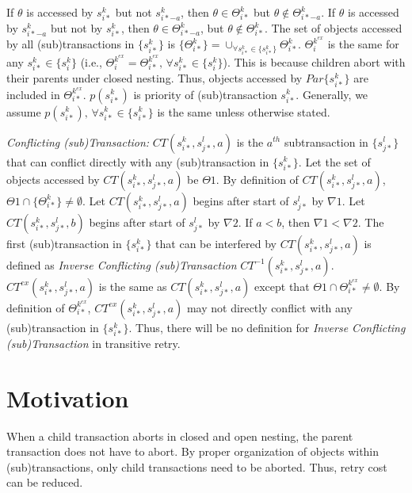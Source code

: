 \documentclass[letter]{sig-alternate}
\begin{document}
If $\theta$ is accessed by $s_{i*}^{k}$ but not $s_{i*-a}^{k}$,
then $\theta\in\Theta_{i*}^{k}$ but $\theta\not\in\Theta_{i*-a}^{k}$.
If $\theta$ is accessed by $s_{i*-a}^{k}$ but not by $s_{i*}^{k}$,
then $\theta\in\Theta_{i*-a}^{k}$, but $\theta\not\in\Theta_{i*}^{k}$.
The set of objects accessed by all (sub)transactions in $\{s_{i*}^{k}\}$
is $\{\Theta_{i*}^{k}\}=\cup_{\forall s_{i*}^{k}\in\{s_{i*}^{k}\}}\Theta_{i*}^{k}$. $\Theta_{i}^{k^{ex}}$
is the same for any $s_{i*}^{k}\in\{s_{i}^{k}\}$ (i.e., $\Theta_{i}^{k^{ex}}=\Theta_{i*}^{k^{ex}},\,\forall s_{i*}^{k}\in\{s_{i}^{k}\}$).
This is because children abort with their parents under closed nesting.
Thus, objects accessed by $Par\{s_{i*}^{k}\}$ are included in $\Theta_{i*}^{k^{ex}}$. $p(s_{i*}^{k})$ is priority of (sub)transaction $s_{i*}^{k}$. Generally,
we assume $p(s_{i*}^{k}),\,\forall s_{i*}^{k}\in\{s_{i*}^{k}\}$ is
the same unless otherwise stated.

\textit{Conflicting (sub)Transaction:} $CT(s_{i*}^{k},s_{j*}^{l},a)$
is the $a^{th}$ subtransaction in $\{s_{j*}^{l}\}$ that can conflict
directly with any (sub)transaction in $\{s_{i*}^{k}\}$. Let the set
of objects accessed by $CT(s_{i*}^{k},s_{j*}^{l},a)$ be $\Theta1$.
By definition of $CT(s_{i*}^{k},s_{j*}^{l},a)$, $\Theta1\cap\{\Theta_{i*}^{k}\}\neq\emptyset$.
Let $CT(s_{i*}^{k},s_{j*}^{l},a)$ begins after start of $s_{j*}^{l}$
by $\nabla1$. Let $CT(s_{i*}^{k},s_{j*}^{l},b)$ begins after start
of $s_{j*}^{l}$ by $\nabla2$. If $a<b$, then $\nabla1<\nabla2$.
The first (sub)transaction in $\{s_{i*}^{k}\}$ that can be interfered
by $CT(s_{i*}^{k},s_{j*}^{l},a)$ is defined as \textit{Inverse Conflicting
(sub)Transaction} $CT^{-1}(s_{i*}^{k},s_{j*}^{l},a)$. $CT^{ex}(s_{i*}^{k},s_{j*}^{l},a)$
is the same as $CT(s_{i*}^{k},s_{j*}^{l},a)$ except that $\Theta1\cap\Theta_{i*}^{k^{ex}}\neq\emptyset$.
By definition of $\Theta_{i*}^{k^{ex}}$, $CT^{ex}(s_{i*}^{k},s_{j*}^{l},a)$
may not directly conflict with any (sub)transaction in $\{s_{i*}^{k}\}$.
Thus, there will be no definition for \textit{Inverse Conflicting
(sub)Transaction} in transitive retry.


\section{Motivation}\label{sec:motivation}

When a child transaction aborts in closed and open nesting, the parent
transaction does not have to abort. By proper organization of objects
within (sub)transactions, only child transactions need to be aborted.
Thus, retry cost can be reduced.
\end{document}
